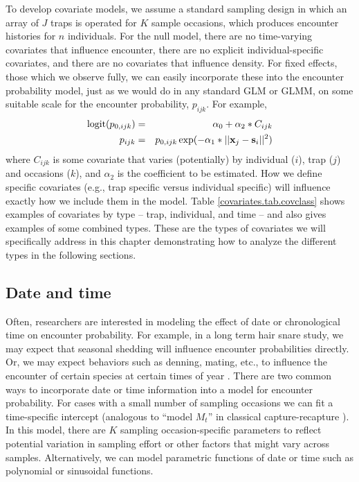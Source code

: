 To develop covariate models, we assume a standard sampling design in which an
array of $J$ traps is operated for $K$ sample occasions, which produces
encounter histories for $n$ individuals.  For the null model, there
are no time-varying covariates that influence encounter, there are no
explicit individual-specific covariates, and there are no covariates
that influence density.  For fixed effects, those which we observe
fully, we can easily incorporate these into the encounter probability
model, just as we would do in any standard GLM or GLMM, on some
suitable scale for the encounter probability, $p_{ijk}$. For example,
\begin{eqnarray*}
\mbox{logit}(p_{0,ijk}) &=& \alpha_0 + \alpha_2*C_{ijk} \\
p_{ijk} &=& p_{0,ijk} \exp(- \alpha_1*||{\bf x}_{j}-{\bf s}_{i}||^2) 
\end{eqnarray*}
where $C_{ijk}$ is some covariate that varies (potentially) by
individual ($i$), trap ($j$) and occasions ($k$), and
$\alpha_2$ is the coefficient to be estimated.
 How we define specific covariates (e.g., trap specific
versus individual specific) will influence exactly how we include them
in the model. Table \ref{covariates.tab.covclass} shows examples of covariates by
type -- trap, individual, and time -- and also gives examples of some combined types.
These are the types of covariates we will specifically address in this chapter demonstrating
how to analyze the different
 types in the following sections.  

\subsection{Date and time}

Often, researchers are interested in modeling the effect of date or
chronological time on 
encounter probability. For example, in a long term hair snare study,
we may expect that seasonal shedding \citep{wegan_etal:2012} will
influence encounter probabilities directly. Or, we may expect
behaviors such as denning, mating, etc., to influence the encounter of
certain species at certain times of year \citep{kery_etal:2011}.
There are two common ways to incorporate date or time information into
a model for encounter probability. For cases with a small number of
sampling occasions we can fit a time-specific intercept (analogous to
``model $M_{t}$'' in classical capture-recapture
\citep{otis_etal:1978}). In this model, there are $K$ sampling
occasion-specific parameters to reflect potential variation in
sampling effort or other factors that might vary across samples.
Alternatively, we can model parametric functions of date or time such
as polynomial or sinusoidal functions.

